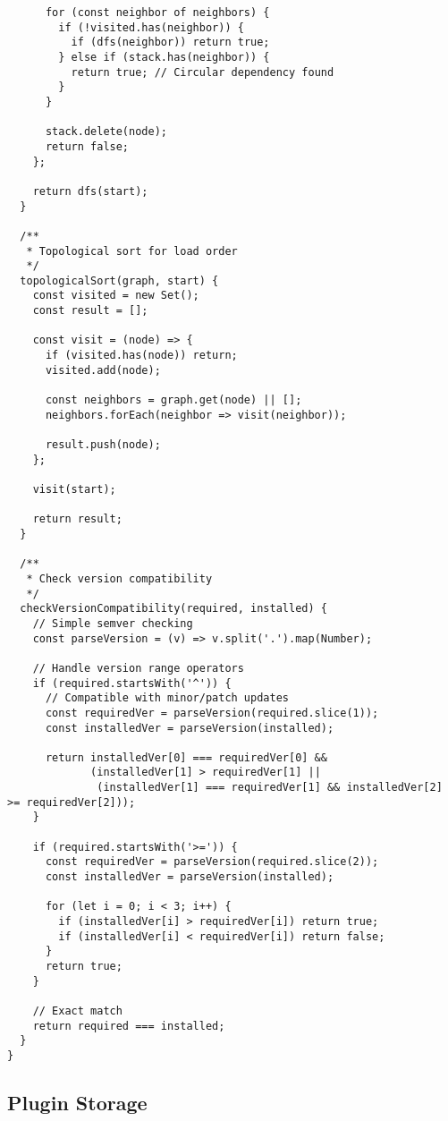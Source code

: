 \documentclass[11pt]{article}
\begin{document}
\begin{verbatim}
      for (const neighbor of neighbors) {
        if (!visited.has(neighbor)) {
          if (dfs(neighbor)) return true;
        } else if (stack.has(neighbor)) {
          return true; // Circular dependency found
        }
      }
      
      stack.delete(node);
      return false;
    };
    
    return dfs(start);
  }
  
  /**
   * Topological sort for load order
   */
  topologicalSort(graph, start) {
    const visited = new Set();
    const result = [];
    
    const visit = (node) => {
      if (visited.has(node)) return;
      visited.add(node);
      
      const neighbors = graph.get(node) || [];
      neighbors.forEach(neighbor => visit(neighbor));
      
      result.push(node);
    };
    
    visit(start);
    
    return result;
  }
  
  /**
   * Check version compatibility
   */
  checkVersionCompatibility(required, installed) {
    // Simple semver checking
    const parseVersion = (v) => v.split('.').map(Number);
    
    // Handle version range operators
    if (required.startsWith('^')) {
      // Compatible with minor/patch updates
      const requiredVer = parseVersion(required.slice(1));
      const installedVer = parseVersion(installed);
      
      return installedVer[0] === requiredVer[0] &&
             (installedVer[1] > requiredVer[1] ||
              (installedVer[1] === requiredVer[1] && installedVer[2] >= requiredVer[2]));
    }
    
    if (required.startsWith('>=')) {
      const requiredVer = parseVersion(required.slice(2));
      const installedVer = parseVersion(installed);
      
      for (let i = 0; i < 3; i++) {
        if (installedVer[i] > requiredVer[i]) return true;
        if (installedVer[i] < requiredVer[i]) return false;
      }
      return true;
    }
    
    // Exact match
    return required === installed;
  }
}
\end{verbatim}
\subsection{Plugin Storage}
\label{sec:org3a67ee4}
\end{document}
